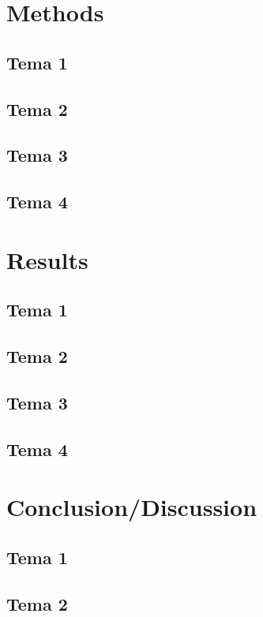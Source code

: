 \documentclass[11pt, A4paper, english]{report}
\begin{document}
\begin{multicols}{2}
		\section{Methods}
			\subsection{Tema 1}


			\subsection{Tema 2}


			\subsection{Tema 3}


			\subsection{Tema 4}


		\section{Results}
			\subsection{Tema 1}


			\subsection{Tema 2}


			\subsection{Tema 3}


			\subsection{Tema 4}


		\section{Conclusion/Discussion}
			\subsection{Tema 1}


			\subsection{Tema 2}



\end{multicols}
\end{document}
